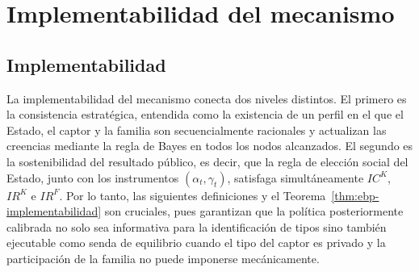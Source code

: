 \documentclass[review,authoryear,12pt]{elsarticle}
\theoremstyle{plain}
\theoremstyle{definition}
\newcommand{\1}{\mathbf{1}}
\begin{document}
\section{Implementabilidad del mecanismo}\label{sec:implementabilidad}

\subsection{Implementabilidad}\label{subsec:implementabilidad}

\noindent La implementabilidad del mecanismo conecta dos niveles distintos. El primero es la consistencia estratégica, entendida como la existencia de un perfil en el que el Estado, el captor y la familia son secuencialmente racionales y actualizan las creencias mediante la regla de Bayes en todos los nodos alcanzados. El segundo es la sostenibilidad del resultado público, es decir, que la regla de elección social del Estado, junto con los instrumentos $(\alpha_t,\gamma_t)$, satisfaga simultáneamente $IC^K$, $IR^K$ e $IR^F$. Por lo tanto, las siguientes definiciones y el Teorema~\ref{thm:ebp-implementabilidad} son cruciales, pues garantizan que la política posteriormente calibrada no solo sea informativa para la identificación de tipos sino también ejecutable como senda de equilibrio cuando el tipo del captor es privado y la participación de la familia no puede imponerse mecánicamente.
\end{document}
